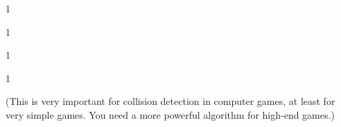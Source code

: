 \nextt
\begin{console}[commandchars=\\\{\}]
1
\end{console}

\nextt
\begin{console}[commandchars=\\\{\}]
1
\end{console}

\nextt
\begin{console}[commandchars=\\\{\}]
1
\end{console}

\nextt
\begin{console}[commandchars=\\\{\}]
1
\end{console}

(This is very important for collision detection in computer games,
at least for very simple games. You need a more powerful algorithm
for high-end games.)
